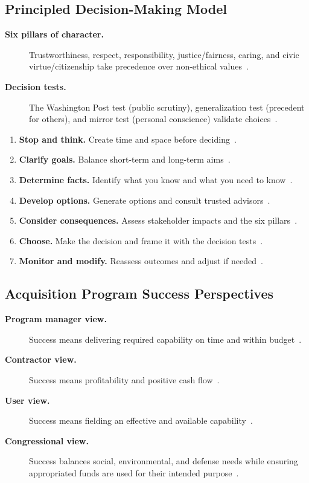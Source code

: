 \documentclass[../main.tex]{subfiles}
\begin{document}
\subsection{Principled Decision-Making Model}
\begin{description}
  \item[\textbf{Six pillars of character.}] Trustworthiness, respect, responsibility, justice/fairness, caring, and civic virtue/citizenship take precedence over non-ethical values~\autocite{edo-5-1-3-ethics-and-acquisition-2025}.
  \item[\textbf{Decision tests.}] The Washington Post test (public scrutiny), generalization test (precedent for others), and mirror test (personal conscience) validate choices~\autocite{edo-5-1-3-ethics-and-acquisition-2025}.
\end{description}
\begin{enumerate}
  \item \textbf{Stop and think.} Create time and space before deciding~\autocite{edo-5-1-3-ethics-and-acquisition-2025}.
  \item \textbf{Clarify goals.} Balance short-term and long-term aims~\autocite{edo-5-1-3-ethics-and-acquisition-2025}.
  \item \textbf{Determine facts.} Identify what you know and what you need to know~\autocite{edo-5-1-3-ethics-and-acquisition-2025}.
  \item \textbf{Develop options.} Generate options and consult trusted advisors~\autocite{edo-5-1-3-ethics-and-acquisition-2025}.
  \item \textbf{Consider consequences.} Assess stakeholder impacts and the six pillars~\autocite{edo-5-1-3-ethics-and-acquisition-2025}.
  \item \textbf{Choose.} Make the decision and frame it with the decision tests~\autocite{edo-5-1-3-ethics-and-acquisition-2025}.
  \item \textbf{Monitor and modify.} Reassess outcomes and adjust if needed~\autocite{edo-5-1-3-ethics-and-acquisition-2025}.
\end{enumerate}

\subsection{Acquisition Program Success Perspectives}
\begin{description}
  \item[\textbf{Program manager view.}] Success means delivering required capability on time and within budget~\autocite{edo-5-1-3-ethics-and-acquisition-2025}.
  \item[\textbf{Contractor view.}] Success means profitability and positive cash flow~\autocite{edo-5-1-3-ethics-and-acquisition-2025}.
  \item[\textbf{User view.}] Success means fielding an effective and available capability~\autocite{edo-5-1-3-ethics-and-acquisition-2025}.
  \item[\textbf{Congressional view.}] Success balances social, environmental, and defense needs while ensuring appropriated funds are used for their intended purpose~\autocite{edo-5-1-3-ethics-and-acquisition-2025}.
\end{description}
\end{document}
